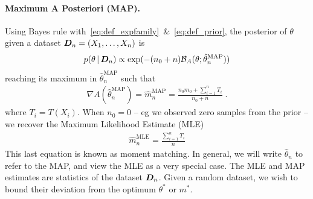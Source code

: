 \documentclass[twoside]{article}
\newcommand{\cond}{\,\vert\,}
\newcommand{\logpart}{A}
\newcommand{\bregman}{\cB_\logpart}
\newcommand{\nat}{\theta}
\newcommand{\m}{m}
\newcommand{\meanp}{\m}
\newcommand{\MAPm}{\hat \m_n}
\newcommand{\MAPt}{\hat \nat_n}
\begin{document}
\paragraph{Maximum A Posteriori (MAP).}
Using Bayes rule with~\eqref{eq:def_expfamily}~\&~\eqref{eq:def_prior}, the posterior of $\nat$ given a dataset ${\bm{D}}_n =(X_1,\dots,X_n)$ is
\begin{align}
	p(\nat \cond \mD_n)
    \propto \exp(- (n_0+n) \bregman(\nat; \MAPt^\text{MAP}))
    \label{eq:joint_likelihood}
\end{align}
reaching its maximum in $\MAPt^\text{MAP}$ such that
\begin{align}
    \nabla \logpart(\MAPt^\text{MAP}) = \MAPm^\text{MAP}
    = \frac{n_0 \meanp_0 + \sum_{i=1}^n T_i}{n_0+n} \; .
\end{align}
where $T_i=T(X_i)$.
When $n_0=0$ -- eg we observed zero samples from the prior -- we recover the Maximum Likelihood Estimate (MLE)
\begin{align}
	\hat \m_n^\text{MLE} = \frac{\sum_{i=1}^n T_i}{n}
\end{align}
This last equation is known as moment matching.
In general, we will write $\MAPt$ to refer to the MAP, and view the MLE as a very special case.
The MLE and MAP estimates are statistics of the dataset ${\bm{D}}_n$.
Given a random dataset, we wish to bound their deviation from the optimum $\nat^*$ or $\meanp^*$.
\end{document}
